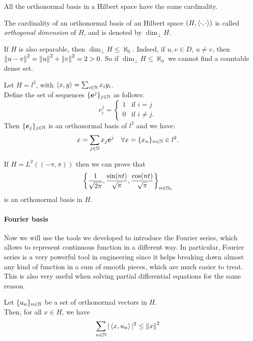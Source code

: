 \begin{theo}
	All the orthonormal basis in a Hilbert space  have the same cardinality.
\end{theo}
\begin{defn}
	The cardinality of an orthonormal basis of an Hilbert space $(H, \left\langle\cdot,\cdot\right\rangle)$ is called \emph{orthogonal dimension} of $H$, and is denoted by $\dim_\perp H$.
\end{defn}
If $H$ is also separable, then $\dim_\perp H \leq \aleph_0$. Indeed, if $u, v \in D$, $u \neq v$, then $\left\lVert u-v\right\rVert^2 = \left\lVert u\right\rVert^2 +\left\lVert v\right\rVert^2 = 2 > 0$. So if $\dim_\perp H \leq \aleph_0$ we cannot find a countable dense set. 


\begin{exam}
	Let $H=l^2$, with $\left\langle x, y\right\rangle = \sum_{i \in \mathbb N} x_i y_i$.\\
	Define the set of sequences $\{\boldsymbol{e}^j\}_{j \in \mathbb N}$ as follows:	
	$$
	e_i^j
	=\begin{cases}
	1 
	& \text{if } i=j \\ 
	0
	& \text{if } i \neq j.
	\end{cases}
	$$
	Then $\{\boldsymbol{e}_j\}_{j \in \mathbb N}$ is an orthonormal basis of $l^2$ and we have:
	$$
	x
	=\sum_{j \in \mathbb N} x_j \boldsymbol{e}^j
	\quad \forall x = \{x_n\}_{n \in \mathbb N} \in l^2.$$
\end{exam}

\begin{exam}
	If $H = L^2((-\pi, \pi))$
	then we can prove that
	$$
		\left\{
			\frac{1}{\sqrt{2\pi}}, 
			\frac{\sin(nt)}{\sqrt \pi}, 
			\frac{\cos(nt)}{\sqrt \pi}
		\right\}_{n \in \mathbb N_0}
	$$
	is an orthonormal basis in $H$. 
\end{exam}

\paragraph{Fourier basis} Now we will use the tools we developed to introduce the Fourier series, which allows to represent continuous function in a different way. In particular, Fourier series is a very powerful tool in engineering since it helps breaking down almost any kind of function in a sum of smooth pieces, which are much easier to treat. This is also very useful when solving partial differential equations for the same reason.

\begin{theo}
	Let $\{u_n\}_{n \in \mathbb N}$ be a set of orthonormal vectors in $H$.\\
	Then, for all $x \in H$, we have
	$$\sum_{n\in\mathbb N} |\left\langle x, u_n\right\rangle|^2 \leq \left\lVert x\right\rVert^2$$
\end{theo}

